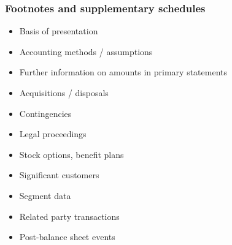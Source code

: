 \documentclass[../notes_compiled.tex]{subfiles}
\begin{document}
\subsubsection{Footnotes and supplementary schedules}
\begin{multicols}{2}
\begin{itemize}
\item Basis of presentation
\item Accounting methods / assumptions
\item Further information on amounts in primary statements
\item Acquisitions / disposals
\item Contingencies
\item Legal proceedings
\item Stock options, benefit plans
\item Significant customers
\item Segment data
\item Related party transactions
\item Post-balance sheet events
\end{itemize}
\end{multicols}
\end{document}
